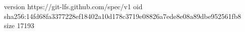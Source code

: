version https://git-lfs.github.com/spec/v1
oid sha256:14fd68fa3377228ef18402a10d178c3719e08826a7ede8e08a89dbe952561fb8
size 17193
